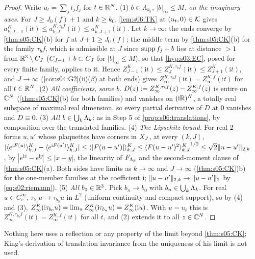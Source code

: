 \begin{proof}
Write $u_t=\sum_jt_jf_j$ for $t\in\mathbb R^N$.
(1) \emph{$b\in\Lambda_{k_0}$, $|b|_\infty\le M$, on the imaginary axes.} For $J\ge J_0(f)+1$ and $k\ge k_0$, \cref{lem:s06:TK} at $(u_t,0)\in\mathcal K$ gives $a^K_{k,J-1}(\mathrm it)\le a^{K,\tau_bf}_{k,J}(\mathrm it)\le a^K_{k,J+1}(\mathrm it)$. Let $k\to\infty$: the ends converge by \cref{thm:s05:CK}(b) for $f$ at $J\mp1\ge J_0(f)$; the middle term by \cref{thm:s05:CK}(b) for the family $\tau_bf$, which is admissible at $J$ since $\operatorname{supp} f_j+b$ lies at distance $>1$ from $\mathbb R^3\setminus C_J$ ($C_{J-1}+b\subset C_J$ for $|b|_\infty\le M$), so that \cref{hyp:s03:EC}, posed for every finite family, applies to it. Hence $Z^K_{J-1}(\mathrm it)\le Z^{K,\tau_bf}_J(\mathrm it)\le Z^K_{J+1}(\mathrm it)$, and $J\to\infty$ (\cref{cor:s04:G2}(ii)($\beta$) at both ends) gives $Z^{K,\tau_bf}_\infty(\mathrm it)=Z^{K,f}_\infty(\mathrm it)$ for all $t\in\mathbb R^N$.
(2) \emph{All coefficients, same $b$.} $D(z):= Z^{K,\tau_bf}_\infty(z)-Z^{K,f}_\infty(z)$ is entire on $\mathbb C^N$ (\cref{thm:s05:CK}(b) for both families) and vanishes on $(\mathrm i\mathbb R)^N$, a totally real subspace of maximal real dimension, so every partial derivative of $D$ at $0$ vanishes and $D\equiv0$.
(3) \emph{All $b\in\bigcup_k\Lambda_k$}: as in Step 5 of \cref{prop:s06:translations}, by composition over the translated families.
(4) \emph{The Lipschitz bound.} For real $2$-forms $u,u'$ whose plaquettes have corners in $X_J$, at every $(k,J)$, $|\langle e^{\mathrm iF(u)}\rangle^{K}_{k,J}-\langle e^{\mathrm iF(u')}\rangle^{K}_{k,J}|\le\langle |F(u-u')|\rangle^{K}_{k,J}\le{\ensuremath{\langle F(u-u')^2\rangle^{K}_{k,J}}}^{1/2}\le\sqrt2\lVert u-u'\rVert_{2,k}$, by $|e^{\mathrm ix}-e^{\mathrm iy}|\le|x-y|$, the linearity of $F_{\Lambda_k}$ and the second-moment clause of \cref{thm:s05:CK}(a). Both sides have limits as $k\to\infty$ and $J\to\infty$ (\cref{thm:s05:CK}(b) for the one-member families at the coefficient $\mathrm i$; $\lVert u-u'\rVert_{2,k}\to\lVert u-u'\rVert_2$ by \eqref{eq:s02:riemann}).
(5) \emph{All $b_0\in\mathbb R^3$.} Pick $b_n\to b_0$ with $b_n\in\bigcup_k\Lambda_k$. For real $u\in C^\infty_c$, $\tau_{b_n}u\to\tau_{b_0}u$ in $L^2$ (uniform continuity and compact support), so by (4) and (3), $Z^{K}_{\infty}(\mathrm i\tau_{b_0}u)=\lim_nZ^{K}_{\infty}(\mathrm i\tau_{b_n}u)=Z^{K}_{\infty}(\mathrm iu)$. With $u=u_t$ this is $Z^{K,\tau_{b_0}f}_\infty(\mathrm it)=Z^{K,f}_\infty(\mathrm it)$ for all $t$, and (2) extends it to all $z\in\mathbb C^N$.
\end{proof}

Nothing here uses a reflection or any property of the limit beyond \cref{thm:s05:CK}; King's derivation of translation invariance from the uniqueness of his limit \cite[Thm.~2.3(i)]{K2} is not used.

